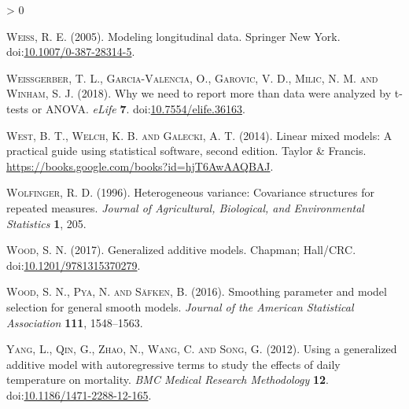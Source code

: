 \documentclass[
]{article}
\newlength{\cslhangindent}
\newenvironment{CSLReferences}[2] %
 {%
  \setlength{\parindent}{0pt}
  \ifodd #1 \everypar{\setlength{\hangindent}{\cslhangindent}}\ignorespaces\fi
  \ifnum #2 > 0
  \setlength{\parskip}{#2\baselineskip}
  \fi
 }%
 {}
\begin{document}
\begin{CSLReferences}{1}{0}
\leavevmode\hypertarget{ref-weiss2005}{}%
\textsc{Weiss, R. E.} (2005). Modeling longitudinal data. Springer New York. doi:\href{https://doi.org/10.1007/0-387-28314-5}{10.1007/0-387-28314-5}.

\leavevmode\hypertarget{ref-weissgerber2018}{}%
\textsc{Weissgerber, T. L., Garcia-Valencia, O., Garovic, V. D., Milic, N. M. and Winham, S. J.} (2018). Why we need to report more than {{}}data were analyzed by t-tests or {ANOVA}{{}}. \emph{{eLife}} \textbf{7}. doi:\href{https://doi.org/10.7554/elife.36163}{10.7554/elife.36163}.

\leavevmode\hypertarget{ref-west2014}{}%
\textsc{West, B. T., Welch, K. B. and Galecki, A. T.} (2014). Linear mixed models: A practical guide using statistical software, second edition. Taylor \& Francis. \url{https://books.google.com/books?id=hjT6AwAAQBAJ}.

\leavevmode\hypertarget{ref-wolfinger1996}{}%
\textsc{Wolfinger, R. D.} (1996). Heterogeneous variance: Covariance structures for repeated measures. \emph{Journal of Agricultural, Biological, and Environmental Statistics} \textbf{1}, 205.

\leavevmode\hypertarget{ref-wood2017}{}%
\textsc{Wood, S. N.} (2017). Generalized additive models. Chapman; Hall/{CRC}. doi:\href{https://doi.org/10.1201/9781315370279}{10.1201/9781315370279}.

\leavevmode\hypertarget{ref-wood2016}{}%
\textsc{Wood, S. N., Pya, N. and Säfken, B.} (2016). Smoothing parameter and model selection for general smooth models. \emph{Journal of the American Statistical Association} \textbf{111}, 1548--1563.

\leavevmode\hypertarget{ref-yang2012}{}%
\textsc{Yang, L., Qin, G., Zhao, N., Wang, C. and Song, G.} (2012). Using a generalized additive model with autoregressive terms to study the effects of daily temperature on mortality. \emph{{BMC} Medical Research Methodology} \textbf{12}. doi:\href{https://doi.org/10.1186/1471-2288-12-165}{10.1186/1471-2288-12-165}.

\end{CSLReferences}
\end{document}
